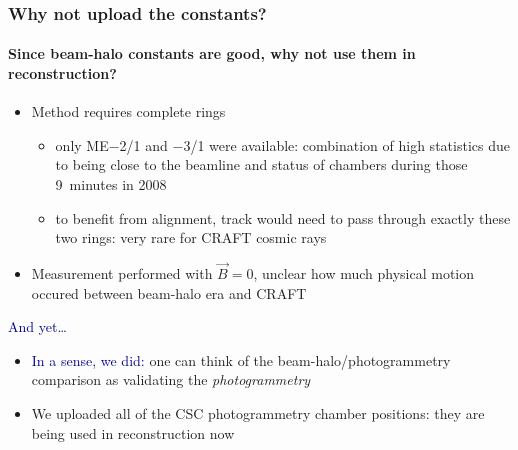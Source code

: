 \documentclass[compress]{beamer}
\begin{document}
\begin{frame}
\frametitle{Why not upload the constants?}
\framesubtitle{Since beam-halo constants are good, why not use them in reconstruction?}

\begin{itemize}
\item Method requires complete rings
\begin{itemize}
\item only ME$-$2/1 and $-$3/1 were available: combination of high
  statistics due to being close to the beamline and status of chambers during those 9~minutes in 2008
\item to benefit from alignment, track would need to pass through exactly these two rings: very rare for CRAFT cosmic rays
\end{itemize}
\item Measurement performed with $\vec{B}=0$, unclear how much physical motion occured between beam-halo era and CRAFT
\end{itemize}

\vspace{0.5 cm}
\hspace{-0.83 cm} \textcolor{darkblue}{\Large And yet\ldots}

\vspace{0.1 cm}
\begin{itemize}
\item \textcolor{darkblue}{In a sense, we did:} one can think of the beam-halo/photogrammetry comparison as validating the {\it photogrammetry}
\item We uploaded all of the CSC photogrammetry chamber positions: they are being used in reconstruction now
\end{itemize}
\end{frame}
\end{document}
